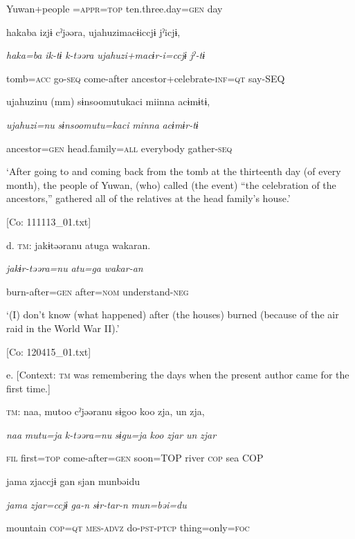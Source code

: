       Yuwan+people    =\textsc{appr}=\textsc{top}  ten.three.day=\textsc{gen}  day

      hakaba  izjɨ  cˀjəəra,  ujahuzimacɨiccjɨ  jˀicjɨ,

      \textit{haka=ba}  \textit{ik-tɨ}  \textit{k-təəra}  \textit{ujahuzi+macɨr-i=ccjɨ}  \textit{jˀ-tɨ}

      tomb=\textsc{acc}  go-\textsc{seq}  come-after  ancestor+celebrate-\textsc{inf}=\textsc{qt}  say-SEQ

      ujahuzinu  (mm)  sɨnsoomutukaci  miinna  acɨmɨtɨ,

      \textit{ujahuzi=nu}    \textit{sɨnsoomutu=kaci}  \textit{minna}  \textit{acɨmɨr-tɨ}

      ancestor=\textsc{gen}    head.family=\textsc{all}  everybody  gather-\textsc{seq}

      ‘After going to and coming back from the tomb at the thirteenth day (of every month), the people of Yuwan, (who) called (the event) “the celebration of the ancestors,” gathered all of the relatives at the head family’s house.’

      [Co: 111113\_01.txt]

  d.  \textsc{tm}:  jakɨtəəranu  atuga  wakaran.

      \textit{jakɨr-təəra=nu}  \textit{atu=ga}  \textit{wakar-an}

      burn-after=\textsc{gen}  after=\textsc{nom}  understand-\textsc{neg}

      ‘(I) don’t know (what happened) after (the houses) burned (because of the air raid in the World War II).’

      [Co: 120415\_01.txt]

  e.  [Context: \textsc{tm} was remembering the days when the present author came for the first time.]

    \textsc{tm}:  naa,  mutoo  cˀjəəranu  sɨgoo  koo  zja,  un  zja,

      \textit{naa}  \textit{mutu=ja}  \textit{k-təəra=nu}  \textit{sɨgu=ja}  \textit{koo}  \textit{zjar}  \textit{un}  \textit{zjar}

      \textsc{fil}  first=\textsc{top}  come-after=\textsc{gen}  soon=TOP  river  \textsc{cop}  sea  COP

      jama  zjaccjɨ  gan  sjan  munbəidu

      \textit{jama}  \textit{zjar=ccjɨ}  \textit{ga-n}  \textit{sɨr-tar-n}  \textit{mun=bəi=du}

      mountain  \textsc{cop}=\textsc{qt}  \textsc{mes}-\textsc{advz}  do-\textsc{pst}-\textsc{ptcp}  thing=only=\textsc{foc}

